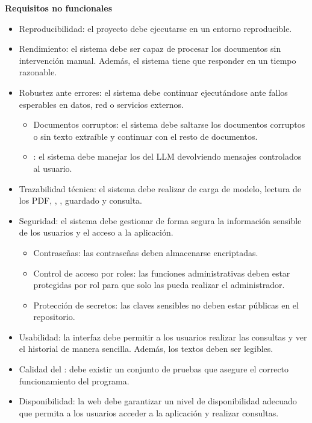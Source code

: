 \textbf{Requisitos no funcionales}
\begin{itemize}
\tightlist
	\item {} Reproducibilidad: el proyecto debe ejecutarse en un entorno reproducible.
	\item {} Rendimiento: el sistema debe ser capaz de procesar los documentos sin intervención manual. Además, el sistema tiene que responder en un tiempo razonable.
	\item {} Robustez ante errores: el sistema debe continuar ejecutándose ante fallos esperables en datos, red o servicios externos.
	\begin{itemize}
	\tightlist
		\item {} Documentos corruptos: el sistema debe saltarse los documentos corruptos o sin texto extraíble y continuar con el resto de documentos.
		\item {} : el sistema debe manejar los  del LLM devolviendo mensajes controlados al usuario.
	\end{itemize}
	\item {} Trazabilidad técnica: el sistema debe realizar  de carga de modelo, lectura de los PDF, , , guardado y consulta.
	\item {} Seguridad: el sistema debe gestionar de forma segura la información sensible de los usuarios y el acceso a la aplicación.
	\begin{itemize}
	\tightlist
		\item {} Contraseñas: las contraseñas deben almacenarse encriptadas.
		\item {} Control de acceso por roles: las funciones administrativas deben estar protegidas por rol para que solo las pueda realizar el administrador.
		\item {} Protección de secretos: las claves sensibles no deben estar públicas en el repositorio.
	\end{itemize}
	\item {} Usabilidad: la interfaz debe permitir a los usuarios realizar las consultas y ver el historial de manera sencilla. Además, los textos deben ser legibles.
	\item {} Calidad del : debe existir un conjunto de pruebas que asegure el correcto funcionamiento del programa. 
	\item {} Disponibilidad: la web debe garantizar un nivel de disponibilidad adecuado que permita a los usuarios acceder a la aplicación y realizar consultas.

\end{itemize}
